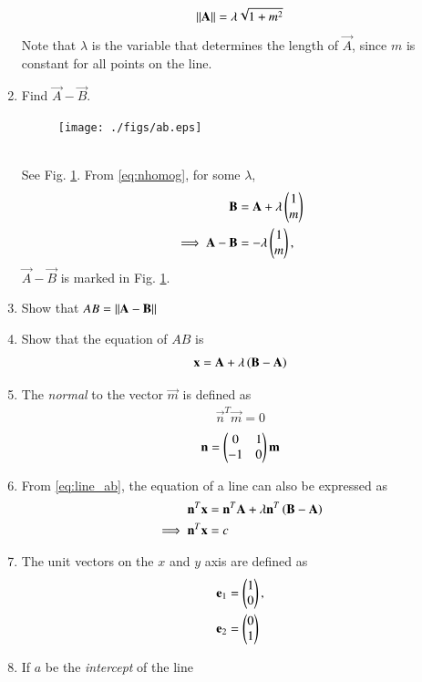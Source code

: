 \begin{enumerate}[label=\arabic*.,ref=\thesubsection.\theenumi]
\begin{equation}
\lVert\mathbf{A}\rVert = \lambda \sqrt{1+m^2}
\end{equation}
%
Note that $\lambda$ is the variable that determines the length of $\vec{A}$, 
since $m$ is constant for all points on the line.
%
\item Find $\vec{A}-\vec{B}$.
\begin{figure}
\centering
\texttt{[image: ./figs/ab.eps]}
\caption{}
\label{fig:ab}
\end{figure}
%
\\
\solution See Fig. \ref{fig:ab}. From \eqref{eq:nhomog}, for some 
$\lambda$,
\begin{align}
\mathbf{B} &=\mathbf{A} + \lambda \begin{pmatrix}1 \\ m\end{pmatrix}
\\
\implies \mathbf{A} - \mathbf{B} &= - \lambda \begin{pmatrix}1 \\ m\end{pmatrix},
\end{align}
%
$\vec{A} - \vec{B}$ is marked in Fig. \ref{fig:ab}.
%
\item Show that $AB = \lVert\mathbf{A}-\mathbf{B}\rVert$
\item Show that the equation of $AB$ is
\begin{align}
\label{eq:line_ab}
\mathbf{x} = \mathbf{A}+ \lambda\left(\mathbf{B}-\mathbf{A}\right)
\end{align}
%
\item The {\em normal} to the vector $\vec{m}$ is defined as
\begin{align}
\label{eq:normal}
\vec{n}^T\vec{m} = 0
\end{align}
\begin{align}
\label{eq:normal_omat}
\mathbf{n} = \begin{pmatrix}0 & 1\\ -1 & 0\end{pmatrix}\mathbf{m}
\end{align}
\item From \eqref{eq:line_ab}, the equation of a line can also be expressed as
\begin{align}
\label{eq:line_ab_normal}
\mathbf{n}^T\mathbf{x} &= \mathbf{n}^T\mathbf{A}+ \lambda\mathbf{n}^T\left(\mathbf{B}-\mathbf{A}\right)
\\
\implies \mathbf{n}^T\mathbf{x} &=c
\end{align}
\item The unit vectors on the $x$ and $y$ axis are defined as
\begin{align}
\label{eq:line_unit}
\mathbf{e}_1 &=\begin{pmatrix}1\\0\end{pmatrix}, 
\\
\mathbf{e}_2 &=\begin{pmatrix}0\\1\end{pmatrix}
\end{align}
\item If $a$ be the {\em intercept} of the line 

\end{enumerate}
